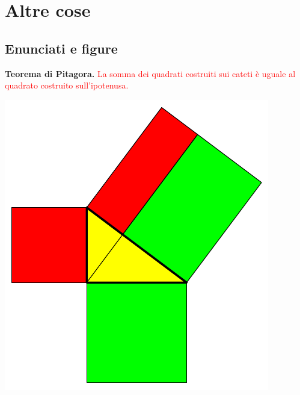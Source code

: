 \documentclass[italian,landscape]{report}
\newcommand{\rosso}[1]{\textcolor{red}{#1}}
\begin{document}

\chapter{Altre cose}


\section{Enunciati e figure}

\begin{firstheadlineitemize}

\item[] \textbf{Teorema di Pitagora.}
\rosso{La somma dei quadrati costruiti sui cateti \`{e} uguale al quadrato costruito sull'ipotenusa.}

\end{firstheadlineitemize}


\pause

\begin{center}
\includegraphics[scale=1.5]{pitagora3}
\end{center}

\end{document}
